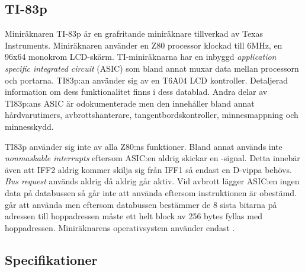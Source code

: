 \documentclass[main.tex]{subfiles}
\begin{document}
\subsection{TI-83p}
Miniräknaren TI-83p är en grafritande miniräknare tillverkad av Texas
Instruments. Miniräknaren använder en Z80 processor klockad till 6MHz, en 96x64
monokrom LCD-skärm. TI-miniräknarna har en inbyggd {\it application specific
integrated circuit} (ASIC) som bland annat muxar data mellan processorn och
portarna. TI83p:an använder sig av en T6A04 LCD kontroller. Detaljerad
information om dess funktionalitet finns i dess datablad\cite{t6a04}. Andra
delar av TI83p:ans ASIC är odokumenterade men den innehåller bland annat
hårdvarutimers, avbrottshanterare, tangentbordskontroller, minnesmappning och
minnesskydd.

TI83p använder sig inte av alla Z80:ns funktioner. Bland annat används inte
{\it nonmaskable interrupts} eftersom ASIC:en aldrig skickar en
-signal. Detta innebär även att IFF2 aldrig kommer skilja sig från
IFF1 så endast en D-vippa behövs. {\it Bus request} används aldrig då
 aldrig går aktiv. Vid avbrott lägger ASIC:en ingen data på
databussen så  går inte att använda eftersom instruktionen är
obestämd.  går att använda men eftersom databussen bestämmer de 8
sista bitarna på adressen till hoppadressen måste ett helt block av 256 bytes
fyllas med hoppadressen. Miniräknarens operativsystem använder endast .


\cite{m45}

\subsection{Specifikationer}
\clearpage
\end{document}
